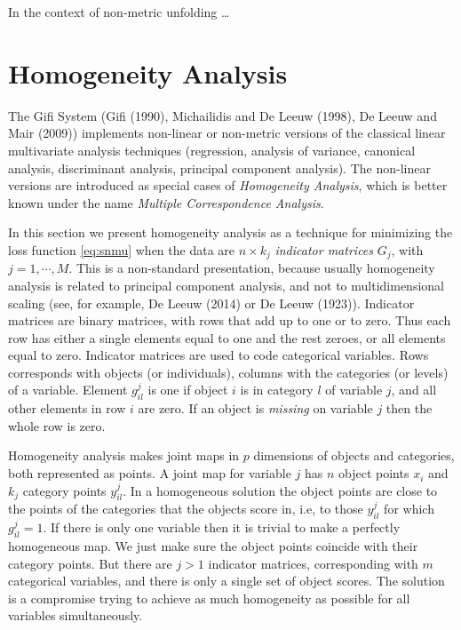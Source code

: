 \documentclass[
  12pt,
]{article}
\begin{document}
In the context of non-metric unfolding \ldots{}

\section{Homogeneity Analysis}\label{hom}

The Gifi System (Gifi (1990), Michailidis and De Leeuw (1998), De Leeuw and Mair (2009)) implements non-linear or non-metric versions of the classical linear multivariate analysis techniques (regression, analysis of variance, canonical analysis, discriminant analysis, principal component analysis). The non-linear versions are introduced as special cases of \emph{Homogeneity Analysis}, which is better known under the name \emph{Multiple Correspondence Analysis}.

In this section we present homogeneity analysis as a technique for
minimizing the loss function \eqref{eq:snmu} when the data are \(n\times k_j\) \emph{indicator matrices} \(G_j\), with \(j=1,\cdots,M\). This is a non-standard
presentation, because usually homogeneity analysis is related to
principal component analysis, and not to multidimensional scaling
(see, for example, De Leeuw (2014) or De Leeuw (1923)).
Indicator matrices are binary matrices, with rows that add up to one or to zero.
Thus each row has either a single elements equal to one and the rest zeroes,
or all elements equal to zero. Indicator matrices are
used to code categorical variables. Rows corresponds with objects
(or individuals), columns with the categories (or levels) of a variable.
Element \(g_{il}^j\) is one if object \(i\) is in category \(l\) of variable \(j\),
and all other elements in row \(i\) are zero. If an object is \emph{missing} on
variable \(j\) then the whole row is zero.

Homogeneity analysis makes joint maps in \(p\) dimensions of objects
and categories, both represented as points. A joint map for variable \(j\)
has \(n\) object points \(x_i\) and \(k_j\) category points \(y^j_{il}\).
In a homogeneous solution the object points are close to the points of the categories that the objects score in, i.e, to those \(y^j_{il}\) for which \(g^j_{il}=1\).
If there is only one variable then it is trivial to make a perfectly
homogeneous map. We just make sure the object points coincide with
their category points. But there are \(j>1\) indicator matrices, corresponding with \(m\) categorical variables, and there is only a single set of object scores. The solution is a compromise trying to achieve as much homogeneity as possible for all variables simultaneously.
\end{document}
